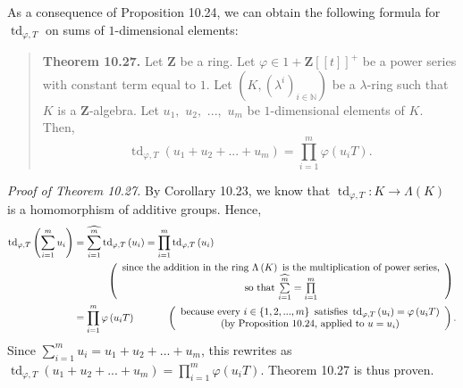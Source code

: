 \documentclass[numbers=enddot,12pt,final,onecolumn,notitlepage]{scrartcl}%
\begin{document}
As a consequence of Proposition 10.24, we can obtain the following formula for
$\operatorname*{td}\nolimits_{\varphi,T}$ on sums of $1$-dimensional elements:

\begin{quote}
\textbf{Theorem 10.27.} Let $\mathbf{Z}$ be a ring. Let $\varphi
\in1+\mathbf{Z}\left[  \left[  t\right]  \right]  ^{+}$ be a power series with
constant term equal to $1$. Let $\left(  K,\left(  \lambda^{i}\right)
_{i\in\mathbb{N}}\right)  $ be a $\lambda$-ring such that $K$ is a
$\mathbf{Z}$-algebra. Let $u_{1},$ $u_{2},$ $...,$ $u_{m}$ be $1$-dimensional
elements of $K$. Then,%
\[
\operatorname*{td}\nolimits_{\varphi,T}\left(  u_{1}+u_{2}+...+u_{m}\right)
=\prod\limits_{i=1}^{m}\varphi\left(  u_{i}T\right)  .
\]



\end{quote}

\textit{Proof of Theorem 10.27.} By Corollary 10.23, we know that
$\operatorname*{td}_{\varphi,T}:K\rightarrow\Lambda\left(  K\right)  $ is a
homomorphism of additive groups. Hence,%
\begin{align*}
\operatorname*{td}\nolimits_{\varphi,T}\left(  \sum\limits_{i=1}^{m}%
u_{i}\right)   &  =\widehat{\sum\limits_{i=1}^{m}}\operatorname*{td}%
\nolimits_{\varphi,T}\left(  u_{i}\right)  =\prod\limits_{i=1}^{m}%
\operatorname*{td}\nolimits_{\varphi,T}\left(  u_{i}\right) \\
&  \ \ \ \ \ \ \ \ \ \ \left(
\begin{array}
[c]{c}%
\text{since the addition in the ring }\Lambda\left(  K\right)  \text{ is the
multiplication of power series,}\\
\text{so that }\widehat{\sum\limits_{i=1}^{m}}=\prod\limits_{i=1}^{m}%
\end{array}
\right) \\
&  =\prod\limits_{i=1}^{m}\varphi\left(  u_{i}T\right)
\ \ \ \ \ \ \ \ \ \ \left(
\begin{array}
[c]{c}%
\text{because every }i\in\left\{  1,2,...,m\right\}  \text{ satisfies
}\operatorname*{td}\nolimits_{\varphi,T}\left(  u_{i}\right)  =\varphi\left(
u_{i}T\right) \\
\text{(by Proposition 10.24, applied to }u=u_{i}\text{)}%
\end{array}
\right)  .
\end{align*}
Since $\sum\limits_{i=1}^{m}u_{i}=u_{1}+u_{2}+...+u_{m}$, this rewrites as
$\operatorname*{td}\nolimits_{\varphi,T}\left(  u_{1}+u_{2}+...+u_{m}\right)
=\prod\limits_{i=1}^{m}\varphi\left(  u_{i}T\right)  $. Theorem 10.27 is thus proven.
\end{document}
